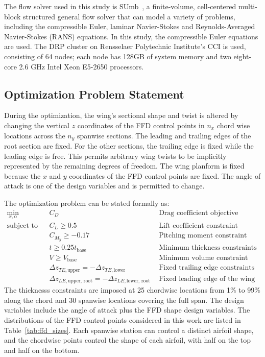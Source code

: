 The flow solver used in this study is SUmb~\cite{sumb_pdf}, a finite-volume, cell-centered multi-block structured general flow solver that can model a variety  of problems, including the compressible Euler, laminar Navier-Stokes and Reynolds-Averaged Navier-Stokes (RANS) equations. In this study, the compressible Euler equations are used. The DRP cluster on Rensselaer Polytechnic Institute's CCI is used, consisting of 64 nodes; each node has 128GB of system memory and two eight-core 2.6 GHz Intel Xeon E5-2650 processors. 

\subsection{Optimization Problem Statement}
During the optimization, the wing's sectional shape and twist is altered 
by changing the vertical $z$ coordinates 
of the FFD control points in $n_x$ chord wise locations across the $n_y$ spanwise sections. The leading and trailing edges of the root section are fixed. For the other sections, the trailing edge is fixed while the leading edge is free. This permits arbitrary wing twists to be implicitly represented by the remaining degrees of freedom. The wing planform is fixed because the $x$ and $y$ coordinates of the FFD control points are fixed. The angle of attack is one of the design variables and is permitted to change.  

The optimization problem can be stated formally as: 
\begin{equation*}
  \begin{alignedat}{2}
    \underset{x, \alpha}{\text{min}} \quad & C_D && \text{Drag coefficient objective}   \\
    \text{subject to} \quad & C_L \geq 0.5  && \text{Lift coefficient constraint}   \\
      & C_{M_y} \geq -0.17          && \text{Pitching moment constraint}   \\
      & t \geq 0.25 t_{\text{base}} && \text{Minimum thickness constraints}   \\
      & V \geq V_{\text{base}} && \text{Minimum volume constraint}   \\
      & \Delta z_{TE, \text{upper}} = -\Delta z_{TE, \text{lower}}  && \text{Fixed trailing edge constraints}   \\
      & \Delta z_{LE, \text{upper, root}} = -\Delta z_{LE, \text{lower, root}} && \text{Fixed leading edge of the wing root}  
  \end{alignedat}
\end{equation*}
The thicknesss constraints are imposed at 25 chordwise locations from 1\% to 99\% along the chord and 30 spanwise locations covering the full span.  The design variables include the angle of attack plus the FFD shape design variables. The distributions of the FFD control points considered in this work are listed in Table~\ref{tab:ffd_sizes}. Each spanwise station can control a distinct airfoil shape, and the chordwise points control the shape of each airfoil, with half on the top and half on the bottom.  
 
